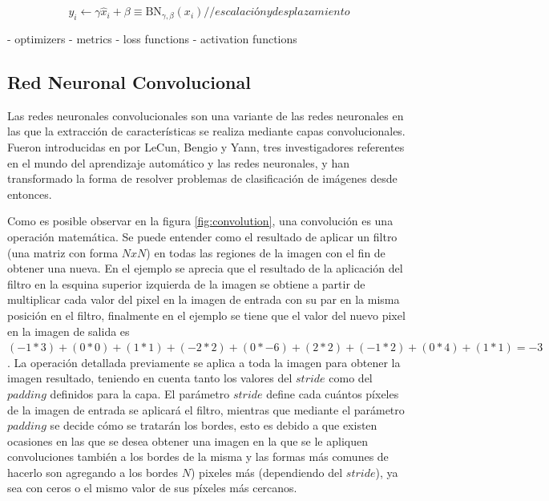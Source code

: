  \begin{equation}\label{formula:bn_scale_and_shift}
 y_{i} \leftarrow \gamma \widehat{x}_{i}+\beta \equiv \mathrm{B} \mathrm{N}_{\gamma, \beta}\left(x_{i}\right) {// escalación y desplazamiento}
 \end{equation}
  
 

	- optimizers
	- metrics
	- loss functions
	- activation functions
	
\subsection{Red Neuronal Convolucional}
Las redes neuronales convolucionales son una variante de las redes neuronales en las que la extracción de características se realiza mediante capas convolucionales. Fueron introducidas en \cite{lecun1995convolutional} por LeCun, Bengio y Yann, tres investigadores referentes en el mundo del aprendizaje automático y las redes neuronales, y han transformado la forma de resolver problemas de clasificación de imágenes desde entonces.

Como es posible observar en la figura \ref{fig:convolution}, una convolución es una operación matemática. Se puede entender como el resultado de aplicar un filtro (una matriz con forma \(N x N\)) en todas las regiones de la imagen con el fin de obtener una nueva. En el ejemplo se aprecia que el resultado de la aplicación del filtro en la esquina superior izquierda de la imagen se obtiene a partir de multiplicar cada valor del pixel en la imagen de entrada con su par en la misma posición en el filtro, finalmente en el ejemplo se tiene que el valor del nuevo pixel en la imagen de salida es \((-1 * 3) + (0 * 0) + (1 * 1) + (-2 * 2) + (0 * -6) + (2 * 2) + (-1 * 2) + (0 * 4) + (1 * 1) = -3 \). La operación detallada previamente se aplica a toda la imagen para obtener la imagen resultado, teniendo en cuenta tanto los valores del \(stride\) como del \(padding\) definidos para la capa. El parámetro \(stride\) define cada cuántos píxeles de la imagen de entrada se aplicará el filtro, mientras que mediante el parámetro \(padding\) se decide cómo se tratarán los bordes, esto es debido a que existen ocasiones en las que se desea obtener una imagen en la que se le apliquen convoluciones también a los bordes de la misma y las formas más comunes de hacerlo son agregando a los bordes \(N\)) pixeles más (dependiendo del \(stride\)), ya sea con ceros o el mismo valor de sus píxeles más cercanos. 

